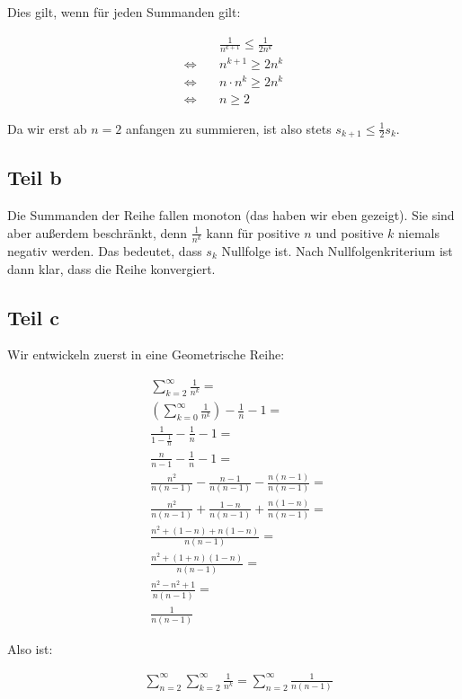 \documentclass[a4paper,german,12pt,smallheadings]{scrartcl}
\begin{document}
Dies gilt, wenn für jeden Summanden gilt:

\begin{align*}
  &\frac{1}{n^{k+1}} \le \frac{1}{2n^k} \\
  \Leftrightarrow\quad& n^{k+1} \ge 2n^k \\
  \Leftrightarrow\quad& n \cdot n^{k} \ge 2n^k \\
  \Leftrightarrow\quad& n \ge 2
\end{align*}

Da wir erst ab $n=2$ anfangen zu summieren, ist also stets $s_{k+1} \le \frac{1}{2}s_k$.

\subsection*{Teil b}
Die Summanden der Reihe fallen monoton (das haben wir eben gezeigt). Sie sind
aber außerdem beschränkt, denn $\frac{1}{n^k}$ kann für positive $n$ und
positive $k$ niemals negativ werden. Das bedeutet, dass $s_k$ Nullfolge ist.
Nach Nullfolgenkriterium ist dann klar, dass die Reihe konvergiert.

\subsection*{Teil c}

Wir entwickeln zuerst in eine Geometrische Reihe:

\begin{align*}
  &\sum_{k=2}^\infty \frac{1}{n^k} = \\
  &\left(\sum_{k=0}^\infty \frac{1}{n^k}\right) - \frac{1}{n} - 1 = \\
  &\frac{1}{1-\frac{1}{n}} - \frac{1}{n} - 1 = \\
  &\frac{n}{n-1} - \frac{1}{n} - 1 = \\
  &\frac{n^2}{n(n-1)} - \frac{n-1}{n(n-1)} - \frac{n(n-1)}{n(n-1)} = \\
  &\frac{n^2}{n(n-1)} + \frac{1-n}{n(n-1)} + \frac{n(1-n)}{n(n-1)} = \\
  &\frac{n^2+(1-n)+n(1-n)}{n(n-1)} = \\
  &\frac{n^2+(1+n)(1-n)}{n(n-1)} = \\
  &\frac{n^2-n^2+1}{n(n-1)} = \\
  &\frac{1}{n(n-1)}
\end{align*}

Also ist:

\begin{align*}
  &\sum_{n=2}^\infty \sum_{k=2}^\infty \frac{1}{n^k} = \sum_{n=2}^\infty \frac{1}{n(n-1)}
\end{align*}
\end{document}
